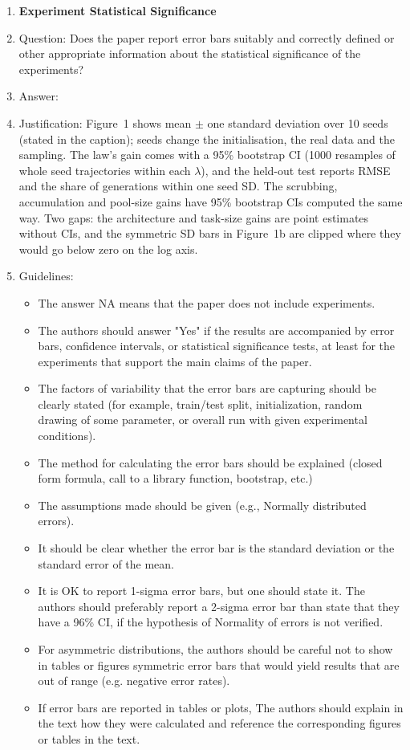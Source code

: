 \begin{enumerate}
\item {\bf Experiment Statistical Significance}
    \item[] Question: Does the paper report error bars suitably and correctly defined or other appropriate information about the statistical significance of the experiments?
    \item[] Answer: \answerYes{}
    \item[] Justification: Figure~1 shows mean $\pm$ one standard deviation over 10 seeds (stated in the caption); seeds change the initialisation, the real data and the sampling. The law's gain comes with a 95\% bootstrap CI (1000 resamples of whole seed trajectories within each $\lambda$), and the held-out test reports RMSE and the share of generations within one seed SD. The scrubbing, accumulation and pool-size gains have 95\% bootstrap CIs computed the same way. Two gaps: the architecture and task-size gains are point estimates without CIs, and the symmetric SD bars in Figure~1b are clipped where they would go below zero on the log axis.
    \item[] Guidelines:
    \begin{itemize}
        \item The answer NA means that the paper does not include experiments.
        \item The authors should answer "Yes" if the results are accompanied by error bars, confidence intervals, or statistical significance tests, at least for the experiments that support the main claims of the paper.
        \item The factors of variability that the error bars are capturing should be clearly stated (for example, train/test split, initialization, random drawing of some parameter, or overall run with given experimental conditions).
        \item The method for calculating the error bars should be explained (closed form formula, call to a library function, bootstrap, etc.)
        \item The assumptions made should be given (e.g., Normally distributed errors).
        \item It should be clear whether the error bar is the standard deviation or the standard error of the mean.
        \item It is OK to report 1-sigma error bars, but one should state it. The authors should preferably report a 2-sigma error bar than state that they have a 96\% CI, if the hypothesis of Normality of errors is not verified.
        \item For asymmetric distributions, the authors should be careful not to show in tables or figures symmetric error bars that would yield results that are out of range (e.g. negative error rates).
        \item If error bars are reported in tables or plots, The authors should explain in the text how they were calculated and reference the corresponding figures or tables in the text.
    \end{itemize}


\end{enumerate}

